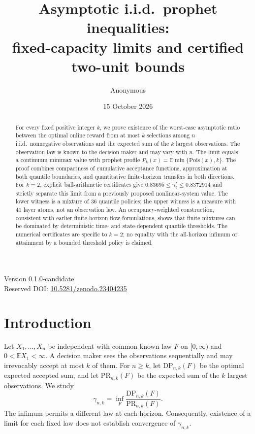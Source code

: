 \documentclass[11pt]{article}
\title{Asymptotic i.i.d.\ prophet inequalities:\\ fixed-capacity limits and certified two-unit bounds}
\author{Anonymous}
\date{15 October 2026}
\theoremstyle{remark}
\newcommand{\Pois}{\mathrm{Pois}}
\begin{document}
\maketitle
\begin{center}
Version 0.1.0-candidate\\
Reserved DOI: \href{https://doi.org/10.5281/zenodo.23404235}{10.5281/zenodo.23404235}
\end{center}
\begin{abstract}
For every fixed positive integer $k$, we prove existence of the worst-case asymptotic ratio between the optimal online reward from at most $k$ selections among $n$ i.i.d.\ nonnegative observations and the expected sum of the $k$ largest observations. The observation law is known to the decision maker and may vary with $n$. The limit equals a continuum minimax value with prophet profile $P_k(x)=\mathbb E\min\{\Pois(x),k\}$. The proof combines compactness of cumulative acceptance functions, approximation at both quantile boundaries, and quantitative finite-horizon transfers in both directions. For $k=2$, explicit ball-arithmetic certificates give $0.83695\le\gamma_2^*\le0.8372914$ and strictly separate this limit from a previously proposed nonlinear-system value. The lower witness is a mixture of $36$ quantile policies; the upper witness is a measure with $41$ layer atoms, not an observation law. An occupancy-weighted construction, consistent with earlier finite-horizon flow formulations, shows that finite mixtures can be dominated by deterministic time- and state-dependent quantile thresholds. The numerical certificates are specific to $k=2$; no equality with the all-horizon infimum or attainment by a bounded threshold policy is claimed.
\end{abstract}

\section{Introduction}
Let $X_1,\ldots,X_n$ be independent with common known law $F$ on $[0,\infty)$ and $0<\mathbb E X_1<\infty$. A decision maker sees the observations sequentially and may irrevocably accept at most $k$ of them. For $n\ge k$, let $\mathrm{DP}_{n,k}(F)$ be the optimal expected accepted sum, and let $\mathrm{PR}_{n,k}(F)$ be the expected sum of the $k$ largest observations. We study
\[
 \gamma_{n,k}=\inf_F\frac{\mathrm{DP}_{n,k}(F)}{\mathrm{PR}_{n,k}(F)}.
\]
The infimum permits a different law at each horizon. Consequently, existence of a limit for each fixed law does not establish convergence of $\gamma_{n,k}$.
\end{document}
